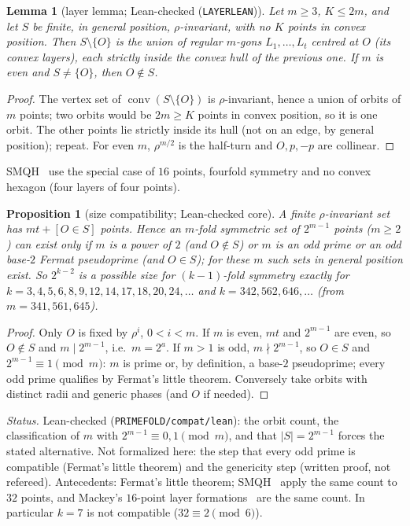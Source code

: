 \documentclass[10pt]{article}
\newtheorem{lemma}[theorem]{Lemma}
\newtheorem{proposition}[theorem]{Proposition}
\theoremstyle{definition}
\theoremstyle{remark}
\newcommand{\conv}{\operatorname{conv}}
\newcommand{\dirn}[1]{{\upshape\nolinkurl{#1}}}
\begin{document}
\begin{lemma}[layer lemma; Lean-checked (\texttt{LAYERLEAN})]\label{lem:layer}
Let $m\ge3$, $K\le2m$, and let $S$ be finite, in general position, $\rho$-invariant, with no $K$ points in convex
position. Then $S\setminus\{O\}$ is the union of regular $m$-gons $L_1,\dots,L_t$ centred at $O$ (its convex layers),
each strictly inside the convex hull of the previous one. If $m$ is even and $S\ne\{O\}$, then $O\notin S$.
\end{lemma}

\begin{proof}
The vertex set of $\conv(S\setminus\{O\})$ is $\rho$-invariant, hence a union of orbits of $m$ points; two orbits would be
$2m\ge K$ points in convex position, so it is one orbit. The other points lie strictly inside its hull (not on an edge,
by general position); repeat. For even $m$, $\rho^{m/2}$ is the half-turn and $O,p,-p$ are collinear.
\end{proof}

SMQH~\cite[\S3.2]{SMQH25} use the special case of $16$ points, fourfold symmetry and no convex hexagon (four layers of
four points).

\begin{proposition}[size compatibility; Lean-checked core]\label{prop:compat}
A finite $\rho$-invariant set has $mt+[O\in S]$ points. Hence an $m$-fold symmetric set of $2^{m-1}$ points ($m\ge2$)
can exist only if $m$ is a power of $2$ (and $O\notin S$) or $m$ is an odd prime or an odd base-$2$ Fermat pseudoprime
(and $O\in S$); for these $m$ such sets in general position exist. So $2^{k-2}$ is a possible size for $(k-1)$-fold
symmetry exactly for $k=3,4,5,6,8,9,12,14,17,18,20,24,\dots$ and $k=342,562,646,\dots$ (from $m=341,561,645$).
\end{proposition}

\begin{proof}
Only $O$ is fixed by $\rho^i$, $0<i<m$. If $m$ is even, $mt$ and $2^{m-1}$ are even, so $O\notin S$ and $m\mid2^{m-1}$,
i.e.\ $m=2^a$. If $m>1$ is odd, $m\nmid2^{m-1}$, so $O\in S$ and $2^{m-1}\equiv1\pmod m$: $m$ is prime or, by
definition, a base-$2$ pseudoprime; every odd prime qualifies by Fermat's little theorem. Conversely take orbits with
distinct radii and generic phases (and $O$ if needed).
\end{proof}

\noindent\emph{Status.} Lean-checked (\dirn{PRIMEFOLD/compat/lean}): the orbit count, the classification of $m$ with
$2^{m-1}\equiv0,1\pmod m$, and that $|S|=2^{m-1}$ forces the stated alternative. Not formalized here: the step that every
odd prime is compatible (Fermat's little theorem) and the genericity step (written proof, not refereed). Antecedents: Fermat's little theorem; SMQH~\cite[\S6.2]{SMQH25}
apply the same count to $32$ points, and Mackey's $16$-point layer formations~\cite{Mac25} are the same count. In
particular $k=7$ is not compatible ($32\equiv2\pmod6$).
\end{document}
